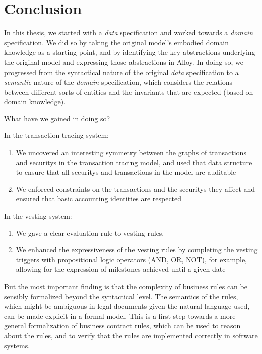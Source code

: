 \chapter{Conclusion}\label{ch:conclusion}

In this thesis, we started with a \textit{data} specification and worked towards a \textit{domain} specification. We did so by taking the original model's embodied domain knowledge as a starting point, and by identifying the key abstractions underlying the original model and expressing those abstractions in Alloy. In doing so, we progressed from the syntactical nature of the original \textit{data} specification to a \textit{semantic} nature of the \textit{domain} specification, which considers the relations between different sorts of entities and the invariants that are expected (based on domain knowledge).

What have we gained in doing so?

In the transaction tracing system:

\begin{enumerate}
	\item We uncovered an interesting symmetry between the graphs of \glspl{transaction} and \glspl{security} in the transaction tracing model, and used that data structure to ensure that all \glspl{security} and transactions in the model are auditable
	\item We enforced constraints on the \glspl{transaction} and the \glspl{security} they affect and ensured that basic accounting identities are respected
\end{enumerate}

In the vesting system:

\begin{enumerate}
	\item We gave a clear evaluation rule to vesting rules.
	\item We enhanced the expressiveness of the vesting rules by completing the vesting triggers with propositional logic operators (AND, OR, NOT), for example, allowing for the expression of milestones achieved until a given date
\end{enumerate}

But the most important finding is that the complexity of business rules can be sensibly formalized beyond the syntactical level. The semantics of the rules, which might be ambiguous in legal documents given the natural language used, can be made explicit in a formal model. This is a first step towards a more general formalization of business contract rules, which can be used to reason about the rules, and to verify that the rules are implemented correctly in software systems.

